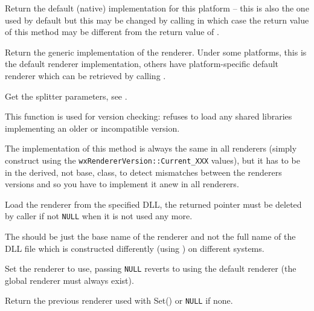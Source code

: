 Return the default (native) implementation for this platform -- this is also
the one used by default but this may be changed by calling 
 in which case the return value of this
method may be different from the return value of .


\label{wxrenderernativegetgeneric}


Return the generic implementation of the renderer. Under some platforms, this
is the default renderer implementation, others have platform-specific default
renderer which can be retrieved by calling .


\label{wxrenderernativegetsplitterparams}


Get the splitter parameters, see 
.


\label{wxrenderernativegetversion}


This function is used for version checking:  
refuses to load any shared libraries implementing an older or incompatible
version.

The implementation of this method is always the same in all renderers (simply
construct  using the 
{\tt wxRendererVersion::Current\_XXX} values), but it has to be in the derived,
not base, class, to detect mismatches between the renderers versions and so you
have to implement it anew in all renderers.


\label{wxrenderernativeload}


Load the renderer from the specified DLL, the returned pointer must be
deleted by caller if not {\tt NULL} when it is not used any more.

The  should be just the base name of the renderer and not the full
name of the DLL file which is constructed differently (using 
) 
on different systems.


\label{wxrenderernativeset}


Set the renderer to use, passing {\tt NULL} reverts to using the default
renderer (the global renderer must always exist).

Return the previous renderer used with Set() or {\tt NULL} if none.

